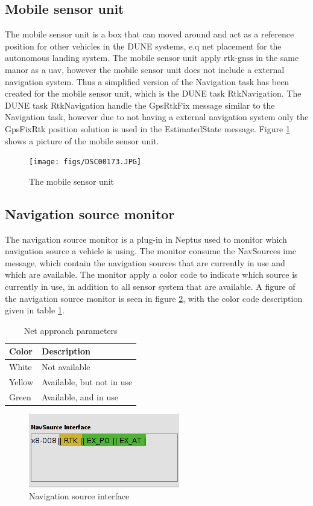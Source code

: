 \subsection{Mobile sensor unit}\label{ss:MobileSensor}
The mobile sensor unit is a box that can moved around and act as a reference position for other vehicles in the DUNE systems, e.q net placement for the autonomous landing system. The mobile sensor unit apply \gls{rtk-gnss} in the same manor as a \gls{uav}, however the mobile sensor unit does not include a external navigation system. Thus a simplified version of the Navigation task has been created for the mobile sensor unit, which is the DUNE task RtkNavigation. The DUNE task RtkNavigation handle the GpsRtkFix message similar to the Navigation task, however due to not having a external navigation system only the GpsFixRtk position solution is used in the EstimatedState message. Figure \ref{Fig:MobileSensor} shows a picture of the mobile sensor unit.
\begin{figure}[H]
\centering
\texttt{[image: figs/DSC00173.JPG]}
\caption{The mobile sensor unit}
\label{Fig:MobileSensor}
\end{figure}
\subsection{Navigation source monitor}
The navigation source monitor is a plug-in in Neptus used to monitor which navigation source a vehicle is using. The monitor consume the NavSources \gls{imc} message, which contain the navigation sources that are currently in use and which are available. The monitor apply a color code to indicate which source is currently in use, in addition to all sensor system that are available. A figure of the navigation source monitor is seen in figure \ref{Fig:NavsourceInterface}, with the color code description given in table \ref{Tb:Color Code}.
\begin{table}[H]
\begin{center}
    \begin{tabular}{ | l | l |}
    \hline
    \textbf{Color} & \textbf{Description} \\ \hline
    White & Not available \\ \hline
    Yellow & Available, but not in use \\ \hline
    Green & Available, and in use \\ \hline
    \end{tabular}
\end{center}
\caption{Net approach parameters }
\label{Tb:Color Code}
\end{table}
\begin{figure}[H]
\centering
\includegraphics[scale=0.6]{figs/NavSourceInterface.png}
\caption{Navigation source interface}
\label{Fig:NavsourceInterface}
\end{figure}
